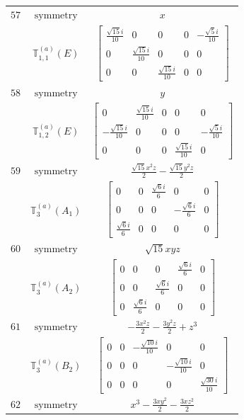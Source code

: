\documentclass[fleqn,8pt,landscape]{jsarticle}
\begin{document}
\begin{longtable}{ccc}
$ 57 $ & $ \text{symmetry} $ & $ x $ \\
$  $ & $ \mathbb{T}_{1,1}^{(a)}(E) $ & $ \begin{bmatrix} \frac{\sqrt{15} i}{10} & 0 & 0 & 0 & - \frac{\sqrt{5} i}{10} \\ 0 & \frac{\sqrt{15} i}{10} & 0 & 0 & 0 \\ 0 & 0 & \frac{\sqrt{15} i}{10} & 0 & 0 \end{bmatrix} $ \\ \hline
$ 58 $ & $ \text{symmetry} $ & $ y $ \\
$  $ & $ \mathbb{T}_{1,2}^{(a)}(E) $ & $ \begin{bmatrix} 0 & \frac{\sqrt{15} i}{10} & 0 & 0 & 0 \\ - \frac{\sqrt{15} i}{10} & 0 & 0 & 0 & - \frac{\sqrt{5} i}{10} \\ 0 & 0 & 0 & \frac{\sqrt{15} i}{10} & 0 \end{bmatrix} $ \\ \hline
$ 59 $ & $ \text{symmetry} $ & $ \frac{\sqrt{15} x^{2} z}{2} - \frac{\sqrt{15} y^{2} z}{2} $ \\
$  $ & $ \mathbb{T}_{3}^{(a)}(A_{1}) $ & $ \begin{bmatrix} 0 & 0 & \frac{\sqrt{6} i}{6} & 0 & 0 \\ 0 & 0 & 0 & - \frac{\sqrt{6} i}{6} & 0 \\ \frac{\sqrt{6} i}{6} & 0 & 0 & 0 & 0 \end{bmatrix} $ \\ \hline
$ 60 $ & $ \text{symmetry} $ & $ \sqrt{15} x y z $ \\
$  $ & $ \mathbb{T}_{3}^{(a)}(A_{2}) $ & $ \begin{bmatrix} 0 & 0 & 0 & \frac{\sqrt{6} i}{6} & 0 \\ 0 & 0 & \frac{\sqrt{6} i}{6} & 0 & 0 \\ 0 & \frac{\sqrt{6} i}{6} & 0 & 0 & 0 \end{bmatrix} $ \\ \hline
$ 61 $ & $ \text{symmetry} $ & $ - \frac{3 x^{2} z}{2} - \frac{3 y^{2} z}{2} + z^{3} $ \\
$  $ & $ \mathbb{T}_{3}^{(a)}(B_{2}) $ & $ \begin{bmatrix} 0 & 0 & - \frac{\sqrt{10} i}{10} & 0 & 0 \\ 0 & 0 & 0 & - \frac{\sqrt{10} i}{10} & 0 \\ 0 & 0 & 0 & 0 & \frac{\sqrt{30} i}{10} \end{bmatrix} $ \\ \hline
$ 62 $ & $ \text{symmetry} $ & $ x^{3} - \frac{3 x y^{2}}{2} - \frac{3 x z^{2}}{2} $ \\

\end{longtable}
\end{document}
